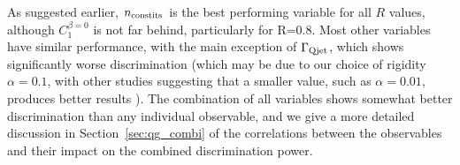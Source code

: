 %
As suggested earlier, $n_{\rm constits}$ is the best performing variable for all $R$ values, although $C_1^{\beta=0}$ is not far behind, particularly
for R=0.8. Most other variables have similar performance, with the main exception of $\Gamma_{\rm Qjet}$, which shows significantly worse
discrimination (which may be due to our choice of
rigidity $\alpha = 0.1$, with other studies suggesting that a smaller value,
such as $\alpha = 0.01$, produces better results \cite{Ellis:2012sn,Ellis:2014eya}). The combination of all variables shows somewhat better discrimination than any individual observable, and
we  give a more detailed discussion in Section~\ref{sec:qg_combi} of the correlations between the observables and their impact on the combined discrimination power.

%
\begin{figure}
\centering
{}
\\
\\

\end{figure}
